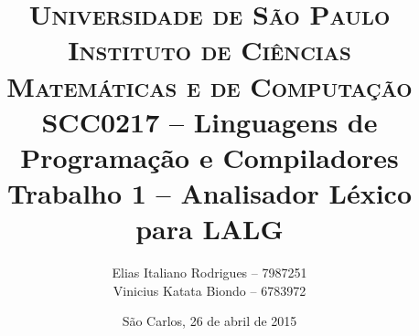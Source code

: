 \begin{titlepage}

		\title{
\textsc {\large{Universidade de São Paulo\\
Instituto de Ciências Matemáticas e de Computação}}\\[1cm]
\large{SCC0217 -- Linguagens de Programação e Compiladores}\\[6cm]
\LARGE{Trabalho 1 -- Analisador Léxico para LALG}\\[5.5cm]
		}

		\author{
Elias Italiano Rodrigues -- 7987251\\
Vinicius Katata Biondo -- 6783972
		}

		\date{
\vfill São Carlos, 26 de abril de 2015
		}

		\maketitle
		\thispagestyle{empty}

\end{titlepage}
